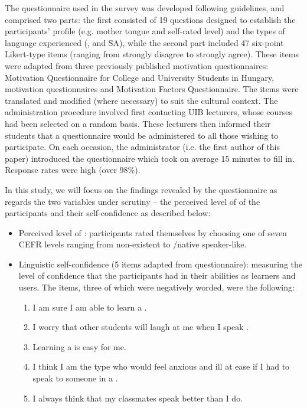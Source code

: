 \documentclass[output=paper]{langsci/langscibook}
\begin{document}
\newpage 
The questionnaire used in the survey was developed following  guidelines, and comprised two parts: the first consisted of 19 questions designed to establish the participants’  profile (e.g. mother tongue and self-rated   level) and the types of language  experienced (,  and SA), while the second part included 47 six-point Likert-type items (ranging from strongly disagree to strongly agree). These items were adapted from three previously published motivation questionnaires: \cite{CsizérKormos2009} Motivation Questionnaire for College and University Students in Hungary,  motivation questionnaires and  Motivation Factors Questionnaire. The items were translated and modified (where necessary) to suit the  cultural context. The administration procedure involved first contacting UIB lecturers, whose  courses had been selected on a random basis. These lecturers then informed their students that a questionnaire would be administered to all those wishing to participate. On each occasion, the administrator (i.e. the first author of this paper) introduced the questionnaire which took on average 15 minutes to fill in. Response rates were high (over 98\%).



In this study, we will focus on the findings revealed by the questionnaire as regards the two variables under scrutiny – the perceived level of  of the participants and their  self-confidence as described below:


\begin{itemize}
\item Perceived level of :  participants rated themselves by choosing one of seven CEFR levels ranging from non-existent to /native speaker-like. 
\item Linguistic self-confidence (5 items adapted from  questionnaire): measuring the level of confidence that the participants had in their abilities as  learners and users. The items, three of which were negatively worded, were the following:

\begin{enumerate}
\item I am sure I am able to learn a .
\item I worry that other students will laugh at me when I speak . 
\item Learning a  is easy for me. 
\item I think I am the type who would feel anxious and ill at ease if I had to speak to someone in a . 
\item I always think that my classmates speak  better than I do. 
\end{enumerate}
\end{itemize}
\end{document}
